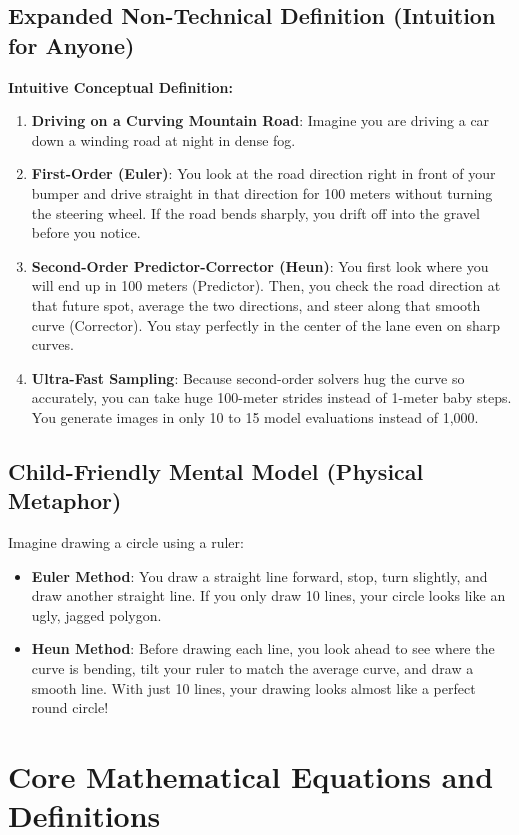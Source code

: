 \documentclass[11pt,a4paper]{article}
\theoremstyle{definition}
\begin{document}
\subsection{Expanded Non-Technical Definition (Intuition for Anyone)}
\textbf{Intuitive Conceptual Definition:}
\begin{enumerate}
    \item \textbf{Driving on a Curving Mountain Road}: Imagine you are driving a car down a winding road at night in dense fog.
    \item \textbf{First-Order (Euler)}: You look at the road direction right in front of your bumper and drive straight in that direction for 100 meters without turning the steering wheel. If the road bends sharply, you drift off into the gravel before you notice.
    \item \textbf{Second-Order Predictor-Corrector (Heun)}: You first look where you will end up in 100 meters (Predictor). Then, you check the road direction at that future spot, average the two directions, and steer along that smooth curve (Corrector). You stay perfectly in the center of the lane even on sharp curves.
    \item \textbf{Ultra-Fast Sampling}: Because second-order solvers hug the curve so accurately, you can take huge 100-meter strides instead of 1-meter baby steps. You generate images in only 10 to 15 model evaluations instead of 1,000.
\end{enumerate}

\subsection{Child-Friendly Mental Model (Physical Metaphor)}
Imagine drawing a circle using a ruler:
\begin{itemize}
    \item \textbf{Euler Method}: You draw a straight line forward, stop, turn slightly, and draw another straight line. If you only draw 10 lines, your circle looks like an ugly, jagged polygon.
    \item \textbf{Heun Method}: Before drawing each line, you look ahead to see where the curve is bending, tilt your ruler to match the average curve, and draw a smooth line. With just 10 lines, your drawing looks almost like a perfect round circle!
\end{itemize}

\section{Core Mathematical Equations and Definitions}
\end{document}
